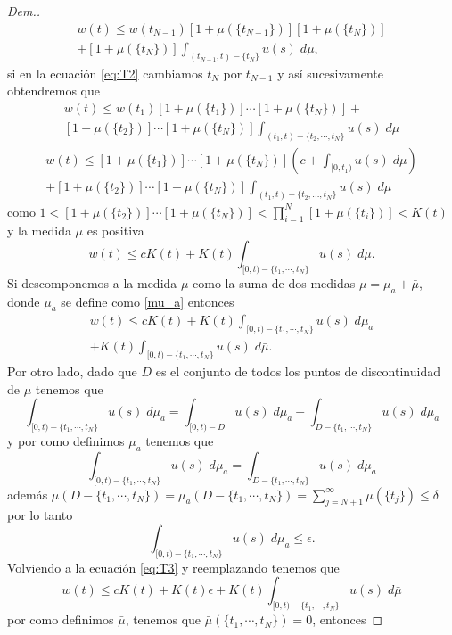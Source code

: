 \begin{proof}[Dem.]
\begin{multline*}
	w(t)\leq w(t_{N-1})\left[1+ \mu(\{t_{N-1}\})\right]\left[ 1+\mu(\{t_N\})\right] \\+\left[ 1+\mu(\{t_N\})\right]\int_{(t_{N-1},t)-\{t_N\}}u(s)\;d\mu, 
\end{multline*}
 si en la ecuación \eqref{eq:T2} cambiamos $t_N$ por $t_{N-1}$ y así sucesivamente obtendremos que  
	\begin{multline*}
		w(t)\leq w(t_1)\left[ 1+\mu(\{t_1\})\right]\cdots \left[ 1+\mu(\{t_N\})\right]+\\ \left[ 1+\mu(\{t_2\})\right]\cdots \left[ 1+\mu(\{t_N\})\right]\int_{(t_1,t)-\{t_2,\cdots ,t_N\}}u(s)\;d\mu
	\end{multline*}
 	\begin{multline*}
		w(t)\leq \left[ 1+\mu(\{t_1\})\right]\cdots \left[ 1+\mu(\{t_N\})\right]\left( c+\int_{[0,t_1)}u(s)\; d\mu\right) \\ +\left[ 1+\mu(\{t_2\})\right]\cdots \left[ 1+\mu(\{t_N\})\right]\int_{(t_1,t)-\{t_2,\ldots ,t_N\}}u(s)\;d\mu
	\end{multline*}
	como $\displaystyle1< \left[ 1+\mu(\{t_2\})\right]\cdots \left[ 1+\mu(\{t_N\})\right]<\prod_{i=1}^{N}\left[ 1+\mu(\{t_i\}) \right]<K(t) $
y la medida $\mu$ es positiva 	
\begin{equation}
	w(t)\leq cK(t)+ K(t)\int_{[0,t)-\{t_1,\cdots ,t_N\}}u(s)\;d\mu.
\end{equation}
Si descomponemos a la medida $\mu$ como la suma de dos medidas $\mu=\mu_a+\bar{\mu}$, donde $\mu_a$ se define como \ref{mu_a} entonces
\begin{equation}\label{eq:T3}
\begin{split}
	w(t)\leq cK(t)+ K(t)\int_{[0,t)-\{t_1,\cdots ,t_N\}}u(s)\;d\mu_a \\ +K(t)\int_{[0,t)-\{t_1,\cdots ,t_N\}}u(s)\;d\bar{\mu}.
 \end{split}
\end{equation}
Por otro lado, dado que $D$ es el conjunto de todos los puntos de discontinuidad de $\mu$ tenemos que
\begin{equation*}
	\int_{[0,t)-\{t_1,\cdots ,t_N\}}u(s)\;d\mu_a=\int_{[0,t)-D}u(s)\;d\mu_a+\int_{D-\{t_1,\cdots ,t_N\}}u(s)\;d\mu_a
\end{equation*}
 y por como definimos $\mu_a$ tenemos que 
\begin{equation*}
	\int_{[0,t)-\{t_1,\cdots ,t_N\}}u(s)\;d\mu_a=\int_{D-\{t_1,\cdots ,t_N\}}u(s)\;d\mu_a
\end{equation*}
además $\mu\left(D-\{t_1,\cdots ,t_N\}\right)=\mu_a\left(D-\{t_1,\cdots ,t_N\}\right)=\displaystyle\sum_{j=N+1}^{\infty}\mu(\{t_j\})\leq \delta$
por lo tanto
\begin{equation*}
	\int_{[0,t)-\{t_1,\cdots ,t_N\}}u(s)\;d\mu_a\leq \epsilon.
\end{equation*}
Volviendo a la ecuación \eqref{eq:T3} y reemplazando tenemos que
\begin{equation*}
	w(t)\leq cK(t) +K(t)\epsilon+K(t)\int_{[0,t)-\{t_1,\cdots ,t_N\}}u(s)\;d\bar{\mu}
\end{equation*}
por como definimos $\bar{\mu}$, tenemos que $\bar{\mu}\left( \{t_1,\cdots,t_N\}\right)=0$, entonces


\end{proof}
